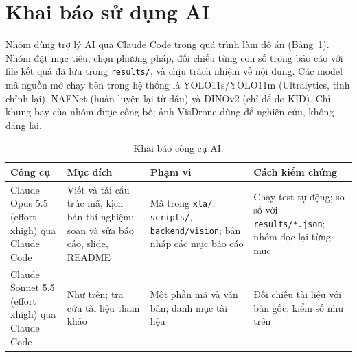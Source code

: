 \section{Khai báo sử dụng AI}\label{sec:ai}

Nhóm dùng trợ lý AI qua Claude Code trong quá trình làm đồ án (Bảng~\ref{tab:ai}). Nhóm đặt mục tiêu, chọn phương pháp, đối chiếu từng con số trong báo cáo với file kết quả đã lưu trong \texttt{results/}, và chịu trách nhiệm về nội dung. Các model mã nguồn mở chạy bên trong hệ thống là YOLO11s/YOLO11m (Ultralytics, tinh chỉnh lại), NAFNet (huấn luyện lại từ đầu) và DINOv2 (chỉ để đo KID). Chỉ khung bay của nhóm được công bố; ảnh VisDrone dùng để nghiên cứu, không đăng lại.

\begin{table}[!htbp]
\centering\footnotesize
\caption{Khai báo công cụ AI.}
\label{tab:ai}
\begin{tabularx}{\textwidth}{@{}>{\raggedright\arraybackslash}p{3.3cm} X X X@{}}
\toprule
Công cụ & Mục đích & Phạm vi & Cách kiểm chứng \\
\midrule
Claude Opus 5.5 (effort xhigh) qua Claude Code & Viết và tái cấu trúc mã, kịch bản thí nghiệm; soạn và sửa báo cáo, slide, README & Mã trong \texttt{xla/}, \texttt{scripts/}, \texttt{backend/vision}; bản nháp các mục báo cáo & Chạy test tự động; so số với \texttt{results/*.json}; nhóm đọc lại từng mục \\
\addlinespace
Claude Sonnet 5.5 (effort xhigh) qua Claude Code & Như trên; tra cứu tài liệu tham khảo & Một phần mã và văn bản; danh mục tài liệu & Đối chiếu tài liệu với bản gốc; kiểm số như trên \\
\bottomrule
\end{tabularx}
\end{table}
